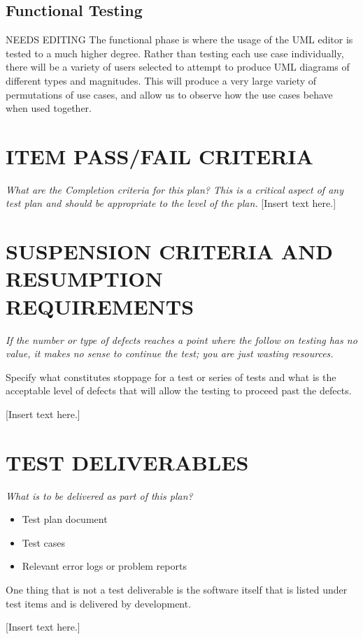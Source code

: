 \documentclass[twoside,letterpaper]{article}
\begin{document}
{\subsection{Functional Testing}
NEEDS EDITING
The functional phase is where the usage of the UML editor is tested to a much higher degree. Rather than testing each use case individually, there will be a variety of users selected to attempt to produce UML diagrams of different types and magnitudes. This will produce a very large variety of permutations of use cases, and allow us to observe how the use cases behave when used together.
}

\section[ITEM PASS/FAIL CRITERIA]{\bfseries\color{black}
	 ITEM PASS/FAIL CRITERIA}
{\itshape\color{black}
What are the Completion criteria for this plan? This is a critical
aspect of any test plan and should be appropriate to the level of the plan.
}
{\color{black}
[Insert text here.]}

\section[SUSPENSION CRITERIA]{\bfseries\color{black}
	 SUSPENSION CRITERIA AND RESUMPTION REQUIREMENTS}
{\itshape\color{black}
If the number or type of defects reaches a point where the follow on
testing has no value, it makes no sense to continue the test; you are
just wasting resources.

Specify what constitutes stoppage for a test or series of tests and
what is the acceptable level of defects that will allow the testing to
proceed past the defects. 
}
{\color{black}
[Insert text here.]}

\section[TEST DELIVERABLES]{\bfseries\color{black} TEST DELIVERABLES}
{\itshape\color{black}
What is to be delivered as part of this plan?

\begin{itemize}
\item Test plan document
\item Test cases
\item Relevant error logs or problem reports
\end{itemize}
One thing that is not a test deliverable is the software itself that
is listed under test items and is delivered by development.
}
{\color{black}
[Insert text here.]}
\end{document}
